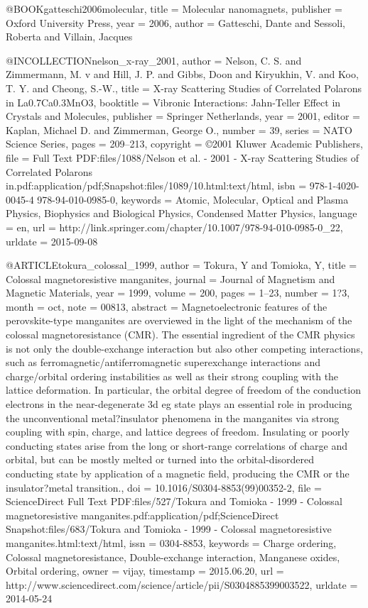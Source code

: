 @BOOK{gatteschi2006molecular,
  title = {Molecular nanomagnets},
  publisher = {Oxford University Press},
  year = {2006},
  author = {Gatteschi, Dante and Sessoli, Roberta and Villain, Jacques}
}

@INCOLLECTION{nelson_x-ray_2001,
  author = {Nelson, C. S. and Zimmermann, M. v and Hill, J. P. and Gibbs, Doon
	and Kiryukhin, V. and Koo, T. Y. and Cheong, S.-W.},
  title = {X-ray {Scattering} {Studies} of {Correlated} {Polarons} in {La}0.7{Ca}0.3{Mn}O3},
  booktitle = {Vibronic {Interactions}: {Jahn}-{Teller} {Effect} in {Crystals} and
	{Molecules}},
  publisher = {Springer Netherlands},
  year = {2001},
  editor = {Kaplan, Michael D. and Zimmerman, George O.},
  number = {39},
  series = {{NATO} {Science} {Series}},
  pages = {209--213},
  copyright = {©2001 Kluwer Academic Publishers},
  file = {Full Text PDF:files/1088/Nelson et al. - 2001 - X-ray Scattering Studies of Correlated        Polarons in.pdf:application/pdf;Snapshot:files/1089/10.html:text/html},
  isbn = {978-1-4020-0045-4 978-94-010-0985-0},
  keywords = {Atomic, Molecular, Optical and Plasma Physics, Biophysics and Biological
	Physics, Condensed Matter Physics},
  language = {en},
  url = {http://link.springer.com/chapter/10.1007/978-94-010-0985-0_22},
  urldate = {2015-09-08}
}

@ARTICLE{tokura_colossal_1999,
  author = {Tokura, Y and Tomioka, Y},
  title = {Colossal magnetoresistive manganites},
  journal = {Journal of Magnetism and Magnetic Materials},
  year = {1999},
  volume = {200},
  pages = {1--23},
  number = {1?3},
  month = oct,
  note = {00813},
  abstract = {Magnetoelectronic features of the perovskite-type manganites are overviewed
	in the light of the mechanism of the colossal magnetoresistance (CMR).
	The essential ingredient of the CMR physics is not only the double-exchange
	interaction but also other competing interactions, such as ferromagnetic/antiferromagnetic
	superexchange interactions and charge/orbital ordering instabilities
	as well as their strong coupling with the lattice deformation. In
	particular, the orbital degree of freedom of the conduction electrons
	in the near-degenerate 3d eg state plays an essential role in producing
	the unconventional metal?insulator phenomena in the manganites via
	strong coupling with spin, charge, and lattice degrees of freedom.
	Insulating or poorly conducting states arise from the long or short-range
	correlations of charge and orbital, but can be mostly melted or turned
	into the orbital-disordered conducting state by application of a
	magnetic field, producing the CMR or the insulator?metal transition.},
  doi = {10.1016/S0304-8853(99)00352-2},
  file = {ScienceDirect Full Text PDF:files/527/Tokura and Tomioka - 1999 - Colossal magnetoresistive manganites.pdf:application/pdf;ScienceDirect Snapshot:files/683/Tokura and Tomioka - 1999 - Colossal magnetoresistive manganites.html:text/html},
  issn = {0304-8853},
  keywords = {Charge ordering, Colossal magnetoresistance, Double-exchange interaction,
	Manganese oxides, Orbital ordering},
  owner = {vijay},
  timestamp = {2015.06.20},
  url = {http://www.sciencedirect.com/science/article/pii/S0304885399003522},
  urldate = {2014-05-24}
}

